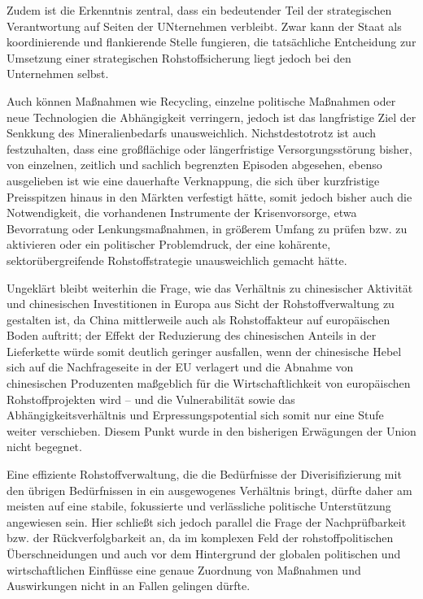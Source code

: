 \documentclass[12pt,a4paper,oneside]{book} %
\begin{document}
{Zudem ist die Erkenntnis zentral, dass ein bedeutender Teil der strategischen Verantwortung auf Seiten der UNternehmen verbleibt. Zwar kann der Staat als koordinierende und flankierende Stelle fungieren, die tatsächliche Entcheidung zur Umsetzung einer strategischen Rohstoffsicherung liegt jedoch bei den Unternehmen selbst.

Auch können Maßnahmen wie Recycling, einzelne politische Maßnahmen oder neue Technologien die Abhängigkeit verringern, jedoch ist das langfristige Ziel der Senkkung des Mineralienbedarfs unausweichlich. Nichstdestotrotz ist auch festzuhalten, dass eine großflächige oder längerfristige Versorgungsstörung bisher, von einzelnen, zeitlich und sachlich begrenzten Episoden abgesehen, ebenso ausgelieben ist wie eine dauerhafte Verknappung, die sich über kurzfristige Preisspitzen hinaus in den Märkten verfestigt hätte, somit jedoch bisher auch die Notwendigkeit, die vorhandenen Instrumente der Krisenvorsorge, etwa Bevorratung oder Lenkungsmaßnahmen, in größerem Umfang zu prüfen bzw. zu aktivieren oder ein politischer Problemdruck, der eine kohärente, sektorübergreifende Rohstoffstrategie unausweichlich gemacht hätte.

Ungeklärt bleibt weiterhin die Frage, wie das Verhältnis zu chinesischer Aktivität und chinesischen Investitionen in Europa aus Sicht der Rohstoffverwaltung zu gestalten ist, da China mittlerweile auch als Rohstoffakteur auf europäischen Boden auftritt; der Effekt der Reduzierung des chinesischen Anteils in der Lieferkette würde somit deutlich geringer ausfallen, wenn der chinesische Hebel sich auf die Nachfrageseite in der EU verlagert und die Abnahme von chinesischen Produzenten maßgeblich für die Wirtschaftlichkeit von europäischen Rohstoffprojekten wird -- und die Vulnerabilität sowie das Abhängigkeitsverhältnis und Erpressungspotential sich somit nur eine Stufe weiter verschieben.
Diesem Punkt wurde in den bisherigen Erwägungen der Union nicht begegnet. 

Eine effiziente Rohstoffverwaltung, die die Bedürfnisse der Diverisifizierung mit den übrigen Bedürfnissen in ein ausgewogenes Verhältnis bringt, dürfte daher am meisten auf eine stabile, fokussierte und verlässliche politische Unterstützung angewiesen sein. Hier schließt sich jedoch parallel die Frage der Nachprüfbarkeit bzw. der Rückverfolgbarkeit an, da im komplexen Feld der rohstoffpolitischen Überschneidungen und auch vor dem Hintergrund der globalen politischen und wirtschaftlichen Einflüsse eine genaue Zuordnung von Maßnahmen und Auswirkungen nicht in an Fallen gelingen dürfte.

}
\end{document}
